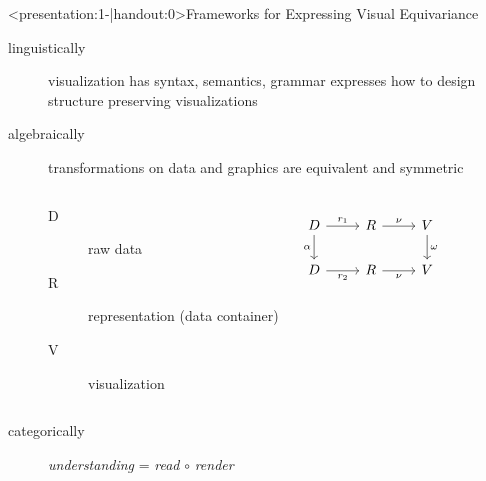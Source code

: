 \documentclass[xcolor={dvipsnames}]{beamer}
\begin{document}
\begin{frame}<presentation:1-|handout:0>{Frameworks for Expressing Visual Equivariance}
    \begin{description}
        \item[linguistically] visualization has syntax, semantics, grammar expresses how to design structure preserving visualizations
        \cite{mackinlayAutomatingDesignGraphical1986,mackinlayAUTOMATICDESIGNGRAPHICAL1987,wilkinsonGrammarGraphics2005}

        \item[algebraically] transformations on data and graphics are equivalent and symmetric \cite{kindlmannAlgebraicProcessVisualization2014}
        \begin{columns}
            \begin{description}
                \item[D] raw data 
                \item[R] representation (data container) 
                \item[V] visualization
            \end{description}
            \begin{equation*}
                \begin{tikzcd}[ampersand replacement=\&]
                    D \arrow[d, "\alpha"'] \arrow[r, "r_1"] \& R \arrow[r, "\nu"]  \& V \arrow[d, "\omega"] \\
                    D \arrow[r, "r_2"']                     \& R \arrow[r, "\nu"'] \& V                    
                \end{tikzcd}
                \end{equation*}
        \end{columns} 
    \item[categorically] \textit{understanding} = \textit{read} $\circ$ \textit{render} \cite{vickersUnderstandingVisualizationFormal2013}    
    \end{description}
\end{frame}
\end{document}
